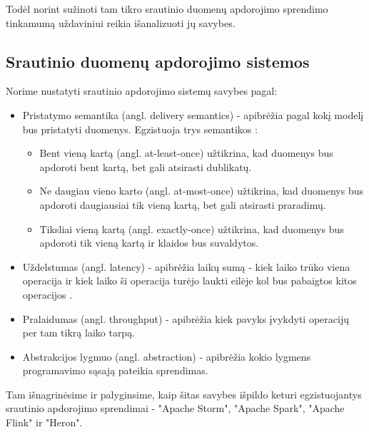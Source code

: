 \documentclass{VUMIFPSbakalaurinis}
\begin{document}
Todėl norint sužinoti tam tikro srautinio duomenų apdorojimo sprendimo tinkamumą uždaviniui reikia išanalizuoti jų savybes.   
\subsection{Srautinio duomenų apdorojimo sistemos}

Norime nustatyti srautinio apdorojimo sistemų savybes pagal:
\begin{itemize}
    \item Pristatymo semantika (angl. delivery semantics) - apibrėžia pagal kokį modelį bus pristatyti duomenys. Egzistuoja trys semantikos \cite{ensar20}: 
    \begin{itemize}
        \item Bent vieną kartą (angl. at-least-once) užtikrina, kad duomenys bus apdoroti bent kartą, bet gali atsirasti dublikatų. 
        \item Ne daugiau vieno karto (angl. at-most-once) užtikrina, kad duomenys bus apdoroti daugiausiai tik vieną kartą, bet gali atsirasti praradimų. 
        \item Tiksliai vieną kartą (angl. exactly-once) užtikrina, kad duomenys bus apdoroti tik vieną kartą ir klaidos bus suvaldytos.
    \end{itemize}
    \item Uždelstumas (angl. latency) - apibrėžia laikų sumą - kiek laiko trūko viena operacija ir kiek laiko ši operacija turėjo laukti eilėje kol bus pabaigtos kitos operacijos \cite{karimov2018benchmarking}.
    \item Pralaidumas (angl. throughput) - apibrėžia kiek pavyks įvykdyti operacijų per tam tikrą laiko tarpą.
    \item Abstrakcijos lygmuo (angl. abstraction) - apibrėžia kokio lygmens programavimo sąsają pateikia sprendimas.
\end{itemize}
Tam išnagrinėsime ir palyginsime, kaip šitas savybes išpildo keturi egzistuojantys srautinio apdorojimo sprendimai - "Apache Storm", "Apache Spark", "Apache Flink" ir "Heron".
\end{document}
